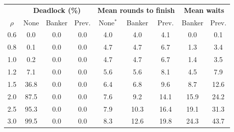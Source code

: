 \begin{tabular}{|c|ccc|ccc|cc|}
\hline
 & \multicolumn{3}{c|}{\textbf{Deadlock (\%)}} & \multicolumn{3}{c|}{\textbf{Mean rounds to finish}} & \multicolumn{2}{c|}{\textbf{Mean waits}} \\
$\rho$ & None & Banker & Prev. & None$^*$ & Banker & Prev. & Banker & Prev. \\ \hline
0.6 & 0.0 & 0.0 & 0.0 & 4.0 & 4.0 & 4.1 & 0.0 & 0.1 \\
0.8 & 0.1 & 0.0 & 0.0 & 4.7 & 4.7 & 6.7 & 1.3 & 3.4 \\
1.0 & 0.2 & 0.0 & 0.0 & 4.7 & 4.7 & 6.7 & 1.4 & 3.5 \\
1.2 & 7.1 & 0.0 & 0.0 & 5.6 & 5.6 & 8.1 & 4.5 & 7.9 \\
1.5 & 36.8 & 0.0 & 0.0 & 6.4 & 6.8 & 9.6 & 8.7 & 12.6 \\
2.0 & 87.5 & 0.0 & 0.0 & 7.6 & 9.2 & 14.1 & 15.9 & 24.2 \\
2.5 & 95.3 & 0.0 & 0.0 & 7.9 & 10.3 & 16.4 & 19.1 & 31.3 \\
3.0 & 99.5 & 0.0 & 0.0 & 8.3 & 12.6 & 19.8 & 24.3 & 43.7 \\
\hline
\end{tabular}
